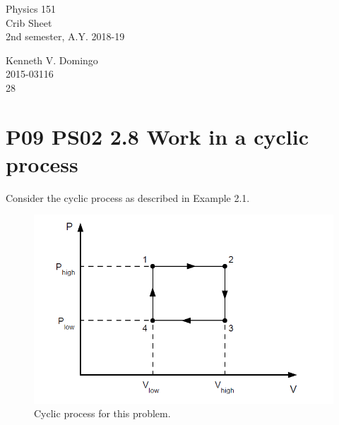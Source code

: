 \documentclass[9pt,a4paper,twocolumn]{article}
\begin{document}
\begin{titlepage}
\begin{center}
\vspace*{\fill}

\normalsize{Physics 151 \\
Crib Sheet \\
2nd semester, A.Y. 2018-19} \\

\qquad
\qquad

\normalsize{Kenneth V. Domingo \\
2015-03116 \\
28}

\vspace*{\fill}
\end{center}
\end{titlepage}

\tableofcontents

\clearpage

\setcounter{page}{1}

\section{P09 PS02 2.8 Work in a cyclic process}
Consider the cyclic process as described in Example 2.1.

\begin{figure}[htb]
	\centering
	\includegraphics[width=0.75\linewidth]{work.png}
	\caption{Cyclic process for this problem.}
	\label{fig:2.8-cycle}
\end{figure}
\end{document}
